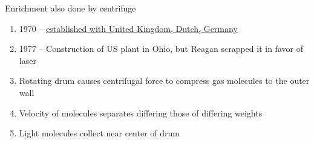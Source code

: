 \documentclass[aspectratio=1610,pdftex,dvipsnames,compress,xcolor={dvipsnames}]{beamer}
\begin{document}
\begin{frame}{Enrichment also done by centrifuge}
    \begin{enumerate}[topsep=0pt,itemsep=21pt,leftmargin=*,label=(\arabic*)]
        \item[]1970 -- \href{https://urenco.com/}{established with United Kingdom, Dutch, Germany}
        \item[]1977 -- Construction of US plant in Ohio, but Reagan scrapped it in favor of laser
        \item[]Rotating drum causes centrifugal force to compress gas molecules to the outer wall
        \item[]Velocity of molecules separates differing those of differing weights
        \item[]Light molecules collect near center of drum
    \end{enumerate}
\end{frame}
\end{document}
